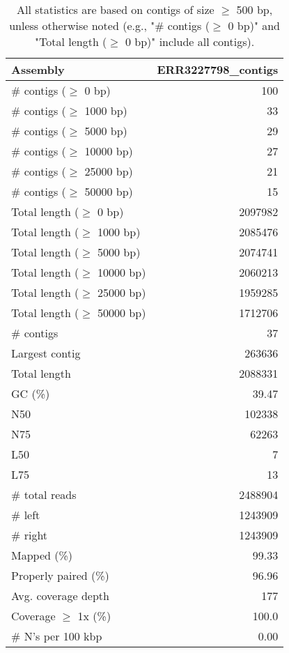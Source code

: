 \documentclass[12pt,a4paper]{article}
\begin{document}
\begin{table}[ht]
\begin{center}
\caption{All statistics are based on contigs of size $\geq$ 500 bp, unless otherwise noted (e.g., "\# contigs ($\geq$ 0 bp)" and "Total length ($\geq$ 0 bp)" include all contigs).}
\begin{tabular}{|l*{1}{|r}|}
\hline
Assembly & ERR3227798\_contigs \\ \hline
\# contigs ($\geq$ 0 bp) & 100 \\ \hline
\# contigs ($\geq$ 1000 bp) & 33 \\ \hline
\# contigs ($\geq$ 5000 bp) & 29 \\ \hline
\# contigs ($\geq$ 10000 bp) & 27 \\ \hline
\# contigs ($\geq$ 25000 bp) & 21 \\ \hline
\# contigs ($\geq$ 50000 bp) & 15 \\ \hline
Total length ($\geq$ 0 bp) & 2097982 \\ \hline
Total length ($\geq$ 1000 bp) & 2085476 \\ \hline
Total length ($\geq$ 5000 bp) & 2074741 \\ \hline
Total length ($\geq$ 10000 bp) & 2060213 \\ \hline
Total length ($\geq$ 25000 bp) & 1959285 \\ \hline
Total length ($\geq$ 50000 bp) & 1712706 \\ \hline
\# contigs & 37 \\ \hline
Largest contig & 263636 \\ \hline
Total length & 2088331 \\ \hline
GC (\%) & 39.47 \\ \hline
N50 & 102338 \\ \hline
N75 & 62263 \\ \hline
L50 & 7 \\ \hline
L75 & 13 \\ \hline
\# total reads & 2488904 \\ \hline
\# left & 1243909 \\ \hline
\# right & 1243909 \\ \hline
Mapped (\%) & 99.33 \\ \hline
Properly paired (\%) & 96.96 \\ \hline
Avg. coverage depth & 177 \\ \hline
Coverage $\geq$ 1x (\%) & 100.0 \\ \hline
\# N's per 100 kbp & 0.00 \\ \hline
\end{tabular}
\end{center}
\end{table}
\end{document}
